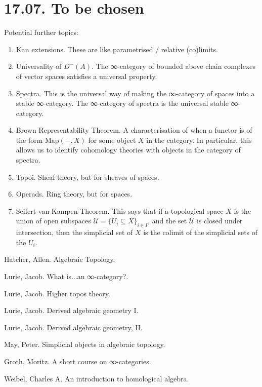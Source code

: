\documentclass[a4paper]{amsart}
\numberwithin{figure}{section}
\theoremstyle{theorem}
\theoremstyle{definition}
\begin{document}
\section{17.07. To be chosen}

Potential further topics:

\begin{enumerate}
 \item Kan extensions. These are like parametrised / relative (co)limits.
 \item Universality of $D^-(A)$. The ∞-category of bounded above chain complexes of vector spaces satisfies a universal property.
 \item Spectra. This is the universal way of making the ∞-category of spaces into a stable ∞-category. The ∞-category of spectra is the universal stable ∞-category. 
 \item Brown Representability Theorem. A characterisation of when a functor is of the form $\mathrm{Map}(-, X)$ for some object $X$ in the category. In particular, this allows us to identify cohomology theories with objects in the category of spectra.
 \item Topoi. Sheaf theory, but for sheaves of spaces.
 \item Operads. Ring theory, but for spaces. 
 \item Seifert-van Kampen Theorem. This says that if a topological space $X$ is the union of open subspaces $\mathscr{U} = \{U_i \subseteq X\}_{i \in I}$, and the set $\mathscr{U}$ is closed under intersection, then the simplicial set of $X$ is the colimit of the simplicial sets of the $U_i$. 
\end{enumerate}



\begin{thebibliography}{99.}

Hatcher, Allen.
\newblock Algebraic Topology.

Lurie, Jacob.
\newblock What is...an ∞-category?.

Lurie, Jacob.
\newblock Higher topos theory.

Lurie, Jacob.
\newblock Derived algebraic geometry I.

Lurie, Jacob.
\newblock Derived algebraic geometry, II.

May, Peter.
\newblock Simplicial objects in algebraic topology.

Groth, Moritz.
\newblock A short course on ∞-categories.

Weibel, Charles  A.
\newblock An introduction to homological algebra.
\end{thebibliography}
\end{document}

